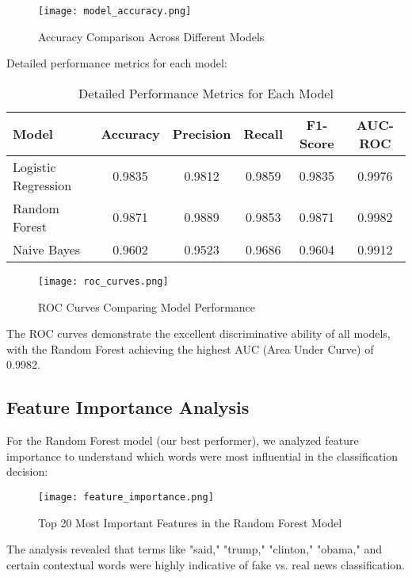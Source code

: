\documentclass[12pt]{article}
\begin{document}
\begin{figure}[h]
    \centering
    \texttt{[image: model\_accuracy.png]}
    \caption{Accuracy Comparison Across Different Models}
\end{figure}

Detailed performance metrics for each model:

\begin{table}[h]
\centering
\begin{tabular}{|l|c|c|c|c|c|}
\hline
\textbf{Model} & \textbf{Accuracy} & \textbf{Precision} & \textbf{Recall} & \textbf{F1-Score} & \textbf{AUC-ROC} \\
\hline
Logistic Regression & 0.9835 & 0.9812 & 0.9859 & 0.9835 & 0.9976 \\
\hline
Random Forest & 0.9871 & 0.9889 & 0.9853 & 0.9871 & 0.9982 \\
\hline
Naive Bayes & 0.9602 & 0.9523 & 0.9686 & 0.9604 & 0.9912 \\
\hline
\end{tabular}
\caption{Detailed Performance Metrics for Each Model}
\end{table}

\begin{figure}[h]
    \centering
    \texttt{[image: roc\_curves.png]}
    \caption{ROC Curves Comparing Model Performance}
\end{figure}

The ROC curves demonstrate the excellent discriminative ability of all models, with the Random Forest achieving the highest AUC (Area Under Curve) of 0.9982.

\subsection{Feature Importance Analysis}
For the Random Forest model (our best performer), we analyzed feature importance to understand which words were most influential in the classification decision:

\begin{figure}[h]
    \centering
    \texttt{[image: feature\_importance.png]}
    \caption{Top 20 Most Important Features in the Random Forest Model}
\end{figure}

The analysis revealed that terms like "said," "trump," "clinton," "obama," and certain contextual words were highly indicative of fake vs. real news classification.
\end{document}
